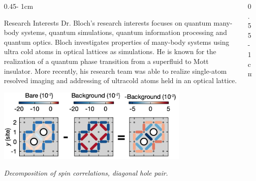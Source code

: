 \documentclass{../psuposter}
\begin{document}
\begin{frame}
\begin{columns}[t, totalwidth=\textwidth]
\begin{column}{0.45\textwidth - 1cm}
    \begin{block}{Research Interests}
        Dr. Bloch's research interests focuses on quantum many-body systems, quantum simulations, quantum information processing and quantum optics. Bloch investigates properties of many-body systems using ultra cold atoms in optical lattices as simulations. He is known for the realization of a quantum phase transition from a superfluid to Mott insulator. \cite{weitenbergSinglespinAddressingAtomic2011} 
        More recently, his research team was able to realize single-atom resolved imaging and addressing of ultracold atoms held in an optical lattice. \cite{shersonSingleatomresolvedFluorescenceImaging2010}
        \begin{center}
	    	\includegraphics[width=0.75\textwidth]{images/diag-hole}    		
    	\end{center}
    	\textit{Decomposition of spin correlations, diagonal hole pair.} \cite{koepsellMicroscopicEvolutionDoped2020}
    \end{block}
\end{column}
\begin{column}{0.55\textwidth - 1cm}



\end{column}
\end{columns}
\end{frame}
\end{document}
